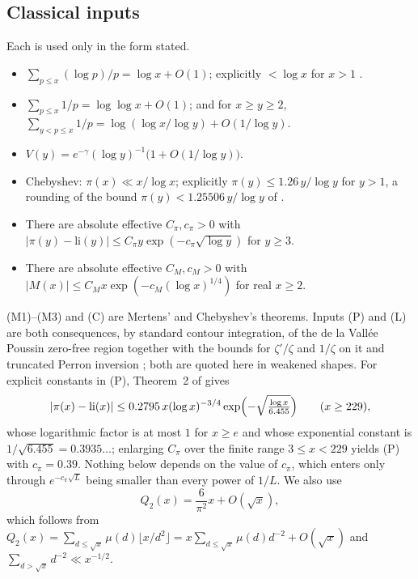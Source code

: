 \documentclass[11pt,a4paper]{article}
\theoremstyle{plain}
\theoremstyle{definition}
\theoremstyle{remark}
\newcommand{\li}{\mathrm{li}}
\begin{document}
\subsection{Classical inputs}\label{sec:inputs}
Each is used only in the form stated.

\begin{itemize}
\item[(M1)] $\sum_{p\le x}(\log p)/p=\log x+O(1)$; explicitly $<\log x$ for $x>1$
  \cite[(3.24)]{RosserSchoenfeld}.
\item[(M2)] $\sum_{p\le x}1/p=\log\log x+O(1)$; and for $x\ge y\ge2$,
  $\sum_{y<p\le x}1/p=\log(\log x/\log y)+O(1/\log y)$.
\item[(M3)] $V(y)=e^{-\gamma}(\log y)^{-1}\bigl(1+O(1/\log y)\bigr)$.
\item[(C)] Chebyshev: $\pi(x)\ll x/\log x$; explicitly $\pi(y)\le1.26\,y/\log y$ for $y>1$, a rounding of
  the bound $\pi(y)<1.25506\,y/\log y$ of \cite[(3.6)]{RosserSchoenfeld}.
\item[(P)] There are absolute effective $C_{\pi},c_{\pi}>0$ with
  $|\pi(y)-\li(y)|\le C_{\pi}y\exp(-c_{\pi}\sqrt{\log y})$ for $y\ge3$.
\item[(L)] There are absolute effective $C_{M},c_{M}>0$ with
  $|M(x)|\le C_{M}x\exp(-c_{M}(\log x)^{1/4})$ for real $x\ge2$.
\end{itemize}

(M1)--(M3) and (C) are Mertens' and Chebyshev's theorems. Inputs (P) and (L) are both consequences, by
standard contour integration, of the de la Vall\'ee Poussin zero-free region \cite[Thm.~3.8]{Titchmarsh}
together with the bounds for $\zeta'/\zeta$ and $1/\zeta$ on it \cite[Thm.~3.11]{Titchmarsh} and truncated
Perron inversion \cite[Lem.~3.12]{Titchmarsh}; both are quoted here in weakened shapes. For
explicit constants in (P), Theorem~2 of \cite{Trudgian} gives
\[
  |\pi(x)-\li(x)|\le0.2795\,x(\log x)^{-3/4}\exp\Bigl(-\sqrt{\tfrac{\log x}{6.455}}\Bigr)
  \qquad(x\ge229),
\]
whose logarithmic factor is at most $1$ for $x\ge e$ and whose exponential constant is
$1/\sqrt{6.455}=0.3935\ldots$; enlarging $C_{\pi}$ over the finite range $3\le x<229$ yields (P) with
$c_{\pi}=0.39$. Nothing below depends on the value of $c_{\pi}$, which enters only through
$e^{-c_{\pi}\sqrt L}$ being smaller than every power of $1/L$. We also use
\begin{equation}\label{eq:Q2}
  Q_{2}(x)=\frac6{\pi^{2}}x+O(\sqrt x),
\end{equation}
which follows from $Q_{2}(x)=\sum_{d\le\sqrt x}\mu(d)\lfloor x/d^{2}\rfloor
=x\sum_{d\le\sqrt x}\mu(d)d^{-2}+O(\sqrt x)$ and $\sum_{d>\sqrt x}d^{-2}\ll x^{-1/2}$.
\end{document}

